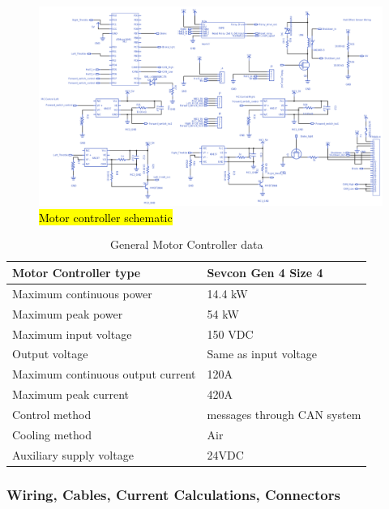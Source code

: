 \documentclass{article}
\DeclareRobustCommand{\hlr}[1]{{\sethlcolor{red}\hl{#1}}}
\begin{document}
            \begin{figure}[H]
             \centering
             \includegraphics[width = 0.85 \textwidth]{MCCschem}
             \caption{\hlr{Motor controller schematic}}
             \label{mccschem}
            \end{figure}

            \begin{table}[H]
            \centering
            \begin{tabular}{|l|l|}
            \hline
            Motor Controller type & Sevcon Gen 4 Size 4 \\ \hline
            Maximum continuous power & 14.4 kW \\ \hline
            Maximum peak power & 54 kW \\ \hline
            Maximum input voltage & 150 VDC \\ \hline
            Output voltage & Same as input voltage \\ \hline
            Maximum continuous output current & 120A \\ \hline
            Maximum peak current & 420A \\ \hline
            Control method & messages through CAN system \\ \hline
            Cooling method & Air \\ \hline
            Auxiliary supply voltage & 24VDC \\ \hline
            \end{tabular}
            \caption{General Motor Controller data}
            \label{MC}
            \end{table}

        \subsubsection{Wiring, Cables, Current Calculations, Connectors} \label{mcwire}
\end{document}
